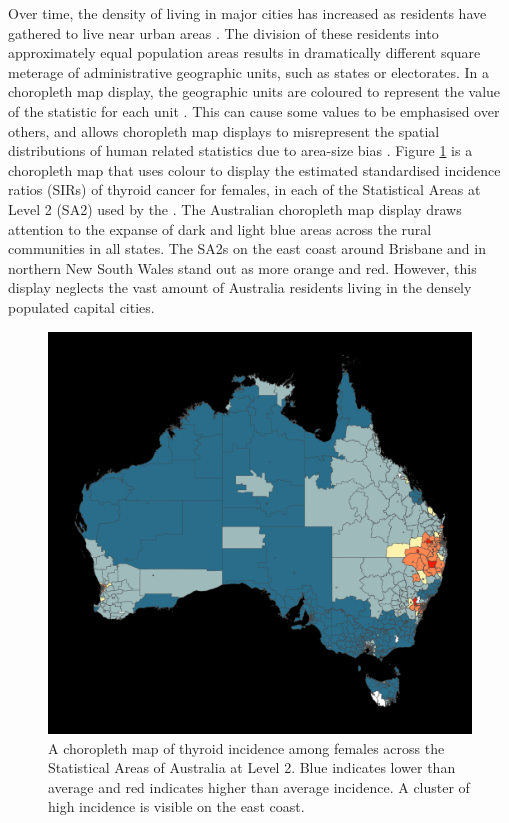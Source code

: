 Over time, the density of living in major cities has increased as
residents have gathered to live near urban areas \citep{ACTUC}. The
division of these residents into approximately equal population areas
results in dramatically different square meterage of administrative
geographic units, such as states or electorates. In a choropleth map
display, the geographic units are coloured to represent the value of the
statistic for each unit \citep{EI}. This can cause some values to be
emphasised over others, and allows choropleth map displays to
misrepresent the spatial distributions of human related statistics due
to area-size bias \citep{BCM}. Figure \ref{fig:choro} is a choropleth
map that uses colour to display the estimated standardised incidence
ratios (SIRs) of thyroid cancer for females, in each of the Statistical
Areas at Level 2 (SA2) used by the \citet{abs2011}. The Australian
choropleth map display draws attention to the expanse of dark and light
blue areas across the rural communities in all states. The SA2s on the
east coast around Brisbane and in northern New South Wales stand out as
more orange and red. However, this display neglects the vast amount of
Australia residents living in the densely populated capital cities.

\begin{Schunk}
\begin{figure}
\includegraphics[width=0.95\linewidth]{kobakian-cook_files/figure-latex/choro-1} \caption[A choropleth map of thyroid incidence among females across the Statistical Areas of Australia at Level 2]{A choropleth map of thyroid incidence among females across the Statistical Areas of Australia at Level 2. Blue indicates lower than average and red indicates higher than average incidence. A cluster of high incidence is visible on the east coast.}\label{fig:choro}
\end{figure}
\end{Schunk}

